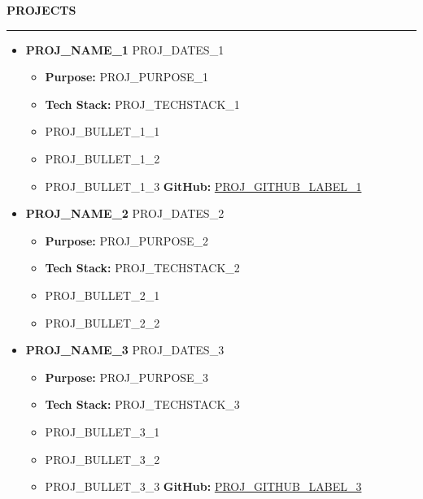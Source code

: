 \documentclass[10pt]{article}
\newcommand{\resheading}[1]{\vspace{6pt} \noindent \textbf{\large\scshape{#1}} \vspace{3pt} \hrule \vspace{4pt}}
\begin{document}
\resheading{PROJECTS}
\begin{itemize}
\item \textbf{{{PROJ_NAME_1}}} \hfill {{PROJ_DATES_1}}
    \begin{itemize}[noitemsep]
        \item \textbf{Purpose:} {{PROJ_PURPOSE_1}}
        \item \textbf{Tech Stack:} {{PROJ_TECHSTACK_1}}
        \item {{PROJ_BULLET_1_1}}
        \item {{PROJ_BULLET_1_2}}
        \item {{PROJ_BULLET_1_3}} \textbf{GitHub:} \href{{{PROJ_GITHUB_URL_1}}}{{{PROJ_GITHUB_LABEL_1}}}
    \end{itemize}
\item \textbf{{{PROJ_NAME_2}}} \hfill {{PROJ_DATES_2}}
    \begin{itemize}[noitemsep]
        \item \textbf{Purpose:} {{PROJ_PURPOSE_2}}
        \item \textbf{Tech Stack:} {{PROJ_TECHSTACK_2}}
        \item {{PROJ_BULLET_2_1}}
        \item {{PROJ_BULLET_2_2}}
    \end{itemize}
\item \textbf{{{PROJ_NAME_3}}} \hfill {{PROJ_DATES_3}}
    \begin{itemize}[noitemsep]
        \item \textbf{Purpose:} {{PROJ_PURPOSE_3}}
        \item \textbf{Tech Stack:} {{PROJ_TECHSTACK_3}}
        \item {{PROJ_BULLET_3_1}}
        \item {{PROJ_BULLET_3_2}}
        \item {{PROJ_BULLET_3_3}} \textbf{GitHub:} \href{{{PROJ_GITHUB_URL_3}}}{{{PROJ_GITHUB_LABEL_3}}}
    \end{itemize}
\end{itemize}
\end{document}
